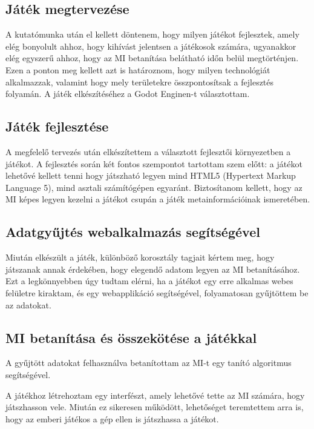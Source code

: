 \subsection{Játék megtervezése}
A kutatómunka után el kellett döntenem, hogy milyen játékot fejlesztek, amely elég bonyolult ahhoz, hogy kihívást jelentsen a játékosok számára, ugyanakkor elég egyszerű ahhoz, hogy az MI betanítása belátható időn belül megtörténjen. Ezen a ponton meg kellett azt is határoznom, hogy milyen technológiát alkalmazzak, valamint hogy mely területekre összpontosítsak a fejlesztés folyamán.
A játék elkészítéséhez a Godot Enginen-t választottam.

\subsection{Játék fejlesztése}
A megfelelő tervezés után elkészítettem a választott fejlesztői környezetben a játékot.
A fejlesztés során két fontos szempontot tartottam szem előtt: 
a játékot lehetővé kellett tenni hogy játszható legyen mind HTML5 (Hypertext Markup Language 5), 
mind asztali számítógépen egyaránt.
Biztosítanom kellett, hogy az MI képes legyen kezelni a játékot csupán a játék metainformációinak ismeretében.

\subsection{Adatgyűjtés webalkalmazás segítségével}
Miután elkészült a játék, különböző korosztály tagjait kértem meg, hogy játszanak annak érdekében, hogy elegendő adatom legyen az MI betanításához. 
Ezt a legkönnyebben úgy tudtam elérni, ha a játékot egy erre alkalmas webes felületre kiraktam, és egy webapplikáció segítségével, folyamatosan gyűjtöttem be az adatokat. 

\subsection{MI betanítása és összekötése a játékkal}
A gyűjtött adatokat felhasználva betanítottam az MI-t egy tanító algoritmus segítségével.

A játékhoz létrehoztam egy interfészt, amely lehetővé tette az MI számára, hogy játszhasson vele. Miután ez sikeresen működött, lehetőséget teremtettem arra is, hogy az emberi játékos a gép ellen is játszhassa a játékot.